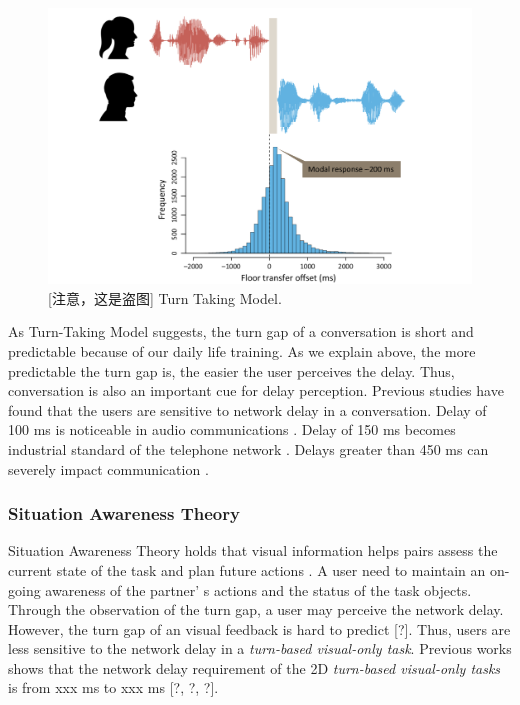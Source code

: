 \begin{figure}[!htbp]
\centering
\includegraphics[width=1.0\linewidth]{figures/figure_turn_taking.png}
\caption{[注意，这是盗图] Turn Taking Model.}
\label{fig:turn_taking}
\end{figure}

As Turn-Taking Model suggests, the turn gap of a conversation is short and predictable because of our daily life training. As we explain above, the more predictable the turn gap is, the easier the user perceives the delay. Thus, conversation is also an important cue for delay perception. Previous studies have found that the users are sensitive to network delay in a conversation. Delay of 100 ms is noticeable in audio communications \cite{wang2010evaluation, itu2003recommendation, recommendation2003114}. Delay of 150 ms becomes industrial standard of the telephone network \cite{recommendation2003114}. Delays greater than 450 ms can severely impact communication \cite{gergle2006impact, o1997characterizing, tang1992users}.

\subsubsection{Situation Awareness Theory}

Situation Awareness Theory holds that visual information helps pairs assess the current state of the task and plan future actions \cite{endsley2017toward, endsley2000situation}. A user need to maintain an on-going awareness of the partner' s actions and the status of the task objects. Through the observation of the turn gap, a user may perceive the network delay. However, the turn gap of an visual feedback is hard to predict [?]. Thus, users are less sensitive to the network delay in a \emph{turn-based visual-only task}. Previous works shows that the network delay requirement of the 2D \emph{turn-based visual-only tasks} is from xxx ms to xxx ms [?, ?, ?].

